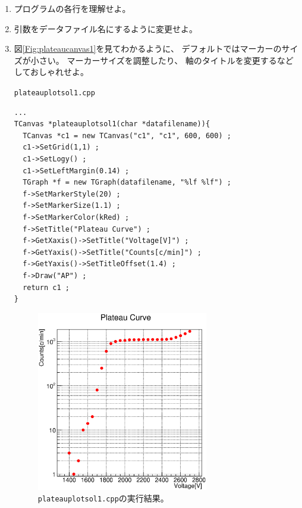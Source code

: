 \documentclass{jarticle}
\begin{document}
\begin{enumerate}
 \item プログラムの各行を理解せよ。
 \item 引数をデータファイル名にするように変更せよ。
 \item 図\ref{Fig:plateaucanvas1}を見てわかるように、
       デフォルトではマーカーのサイズが小さい。
       マーカーサイズを調整したり、
       軸のタイトルを変更するなどしておしゃれせよ。
         \begin{itembox}{\texttt{plateauplotsol1.cpp}}
\begin{verbatim}
...
TCanvas *plateauplotsol1(char *datafilename)){
  TCanvas *c1 = new TCanvas("c1", "c1", 600, 600) ;
  c1->SetGrid(1,1) ;
  c1->SetLogy() ;
  c1->SetLeftMargin(0.14) ;
  TGraph *f = new TGraph(datafilename, "%lf %lf") ;
  f->SetMarkerStyle(20) ;
  f->SetMarkerSize(1.1) ;
  f->SetMarkerColor(kRed) ;
  f->SetTitle("Plateau Curve") ;
  f->GetXaxis()->SetTitle("Voltage[V]") ;
  f->GetYaxis()->SetTitle("Counts[c/min]") ;
  f->GetYaxis()->SetTitleOffset(1.4) ;
  f->Draw("AP") ;
  return c1 ;
}
\end{verbatim}
  \end{itembox}
\begin{figure}[htbp]
   \begin{center}
    \includegraphics[width = 75mm]{./picture/plateaucanvas2.eps}
   \end{center}
   \caption{\texttt{plateauplotsol1.cpp}の実行結果。}
   \label{Fig:plateaucanvas2}
\end{figure}
\end{enumerate}



 
 
\end{document}
